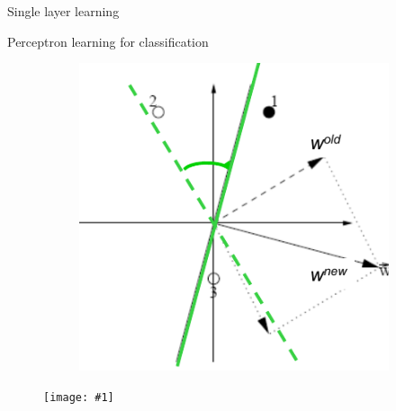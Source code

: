 \documentclass[9pt,t]{beamer}
\newcommand{\picEqHereWidth}[2] { %
    \begin{figure}[htp] 
        \centering
        \texttt{[image: \#1]}
    \end{figure}
}
\begin{document}
\begin{frame}{Single layer learning}
\begin{alertblock}{Perceptron learning for classification}
\begin{figure}[htp!]
\begin{subfigure}{.3\textwidth}
            \end{subfigure}
            \begin{subfigure}{.3\textwidth}
                \centering
                \includegraphics[width=\linewidth]{../images/perceptron_learning3.png}
            \end{subfigure}
        \end{figure}
        \picEqHereWidth{../images/perceptron_learning_eq.png}{0.3\linewidth}
    \end{alertblock}
\end{frame}
\end{document}
